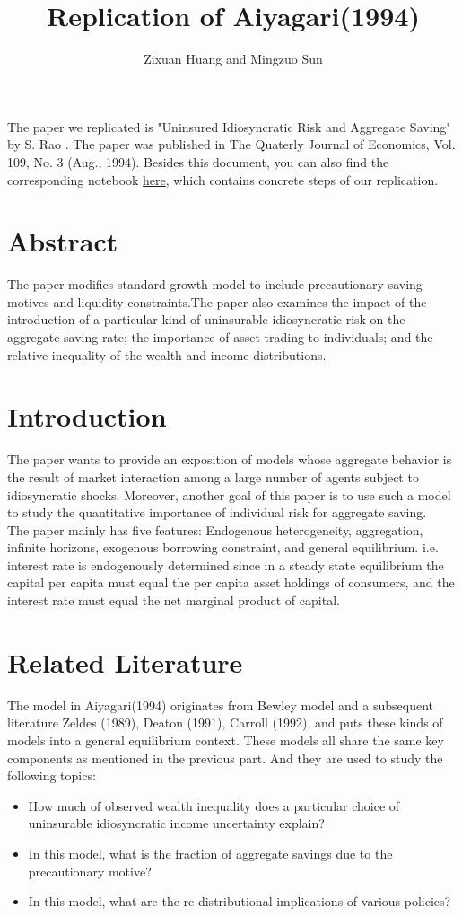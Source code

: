 \documentclass[]{article}
\title{Replication of Aiyagari(1994)}
\author{Zixuan Huang and Mingzuo Sun}
\date{}
\begin{document}
\linespread{2}
\maketitle




The paper we replicated is "Uninsured Idiosyncratic Risk and Aggregate Saving" by S. Rao  \cite{1994}. The paper was published in The Quaterly Journal of Economics, Vol. 109, No. 3 (Aug., 1994). Besides this document, you can also find the corresponding notebook \href{run:../Aiyagari1994QJE.ipynb}{here}, which contains concrete steps of our replication.

\section{Abstract}
The paper modifies standard growth model to include precautionary saving motives and liquidity constraints.The paper also examines the impact of the introduction of a particular kind of uninsurable idiosyncratic risk on the aggregate saving rate; the importance of asset trading to individuals; and the relative inequality of the wealth and income distributions. 

\section{Introduction}
The paper wants to provide an exposition of models whose aggregate behavior is the result of market interaction among a large number of agents subject to idiosyncratic shocks. Moreover, another goal of this paper is to use such a model to study the quantitative importance of individual risk for aggregate saving.\\

The paper mainly has five features: Endogenous heterogeneity, aggregation, infinite horizons, exogenous borrowing constraint, and general equilibrium. i.e. interest rate is endogenously determined since in a steady state equilibrium the capital per capita must equal the per capita asset holdings of consumers, and the interest rate must equal the net marginal product of capital. 

\section{Related Literature}
The model in Aiyagari(1994) originates from Bewley model and a subsequent literature Zeldes (1989), Deaton (1991), Carroll (1992), and puts these kinds of models into a general equilibrium context. These models all share the same key components as mentioned in the previous part. And they are used to study the following topics:
\begin{itemize}
	\item How much of observed wealth inequality does a particular choice of uninsurable idiosyncratic income uncertainty explain? 
	\item In this model, what is the fraction of aggregate savings due to the precautionary motive? 
	\item In this model, what are the re-distributional implications of various policies?
\end{itemize}
\end{document}

